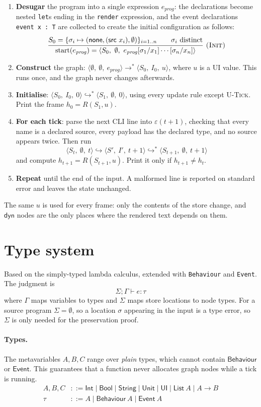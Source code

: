 \documentclass{article}
\makeatletter
\newcommand{\kw}[1]{\mathsf{#1}}
\newcommand{\none}{\kw{none}}
\newcommand{\cfg}[3]{\langle #1,\ #2,\ #3\rangle}
\newcommand{\step}{\longrightarrow}
\newcommand{\ustep}{\hookrightarrow}
\newcommand{\ustar}{\hookrightarrow^{*}}
\newcommand{\rul}[3]{\[\dfrac{\begin{array}{@{}c@{}}#2\end{array}}{\begin{array}{@{}c@{}}#3\end{array}}\ \textsc{#1}\]}
\makeatother
\begin{document}
\begin{enumerate}
  \item \textbf{Desugar} the program into a single expression $e_{\mathit{prog}}$: the declarations become nested \texttt{let}s ending in the \texttt{render} expression, and the event declarations \texttt{event x : T} are collected to create the initial configuration as follows:
\rul{(Init)}{S_0 = \{\sigma_i \mapsto (\none,(\kw{src}\ x_i),\emptyset)\}_{i=1..n} \qquad \sigma_i \text{ distinct}}
{\mathrm{start}(e_{\mathit{prog}}) = \cfg{S_0}{\emptyset}{e_{\mathit{prog}}[\sigma_1/x_1]\cdots[\sigma_n/x_n]}}
  \item \textbf{Construct} the graph: $\cfg{\emptyset}{\emptyset}{e_{\mathit{prog}}} \step^{*} \cfg{S_0}{I_0}{u}$, where $u$ is a UI value. This runs once, and the graph never changes afterwards.
  \item \textbf{Initialise}: $\cfg{S_0}{I_0}{0} \ustar \cfg{S_1}{\emptyset}{0}$, using every update rule except \textsc{U-Tick}. Print the frame $h_0 = R(S_1,u)$.
  \item \textbf{For each tick}: parse the next CLI line into $\varepsilon(t+1)$, checking that every name is a declared source, every payload has the declared type, and no source appears twice. Then run
  \[\cfg{S_t}{\emptyset}{t} \ustep \cfg{S'}{I'}{t+1} \ustar \cfg{S_{t+1}}{\emptyset}{t+1}\]
  and compute $h_{t+1} = R(S_{t+1},u)$. Print it only if $h_{t+1} \neq h_t$.
  \item \textbf{Repeat} until the end of the input. A malformed line is reported on standard error and leaves the state unchanged.
\end{enumerate}
The same $u$ is used for every frame: only the contents of the store change, and $\kw{dyn}$ nodes are the only places where the rendered text depends on them.

\section{Type system}

Based on the simply-typed lambda calculus, extended with \texttt{Behaviour} and \texttt{Event}.
The judgment is
\[ \Sigma;\Gamma \vdash e : \tau \]
where $\Gamma$ maps variables to types and $\Sigma$ maps store locations to node types.
For a source program $\Sigma = \emptyset$, so a location $\sigma$ appearing in the input is a type error, so
$\Sigma$ is only needed for the preservation proof.

\paragraph{Types.} The metavariables $A, B, C$ range over \emph{plain} types, which cannot contain
$\kw{Behaviour}$ or $\kw{Event}$. This guarantees that a function never allocates graph nodes while a tick is running.
\begin{align*}
A, B, C &::= \kw{Int} \mid \kw{Bool} \mid \kw{String} \mid \kw{Unit} \mid \kw{UI} \mid \kw{List}\ A \mid A \to B\\
\tau &::= A \mid \kw{Behaviour}\ A \mid \kw{Event}\ A
\end{align*}
\end{document}
